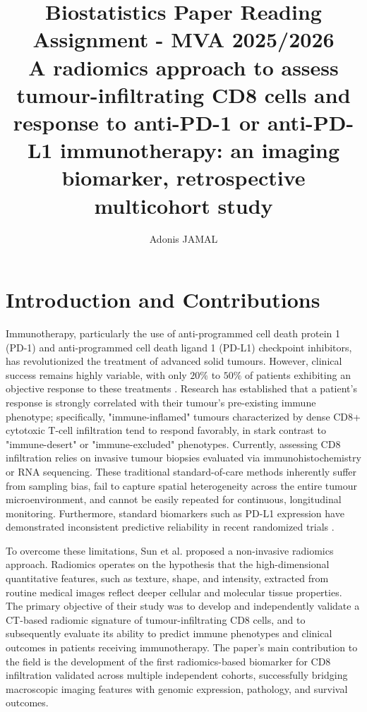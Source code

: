 \documentclass[10pt]{article}
\title{\vspace{-2cm}
      \LARGE{Biostatistics Paper Reading Assignment - MVA 2025/2026}
      \\ \large{A radiomics approach to assess tumour-infiltrating CD8 cells and response to anti-PD-1 or anti-PD-L1 immunotherapy: an imaging biomarker, retrospective multicohort study}
      }
\author{
Adonis JAMAL \email{adonis.jamal@student-cs.fr}
}
\date{\vspace{-5ex}}
\begin{document}
\maketitle


\section{Introduction and Contributions}
Immunotherapy, particularly the use of anti-programmed cell death protein 1 (PD-1) and anti-programmed cell death ligand 1 (PD-L1) checkpoint inhibitors, has revolutionized the treatment of advanced solid tumours. However, clinical success remains highly variable, with only $20\%$ to $50\%$ of patients exhibiting an objective response to these treatments \cite{chen2017elements}. Research has established that a patient's response is strongly correlated with their tumour's pre-existing immune phenotype; specifically, "immune-inflamed" tumours characterized by dense CD8+ cytotoxic T-cell infiltration tend to respond favorably, in stark contrast to "immune-desert" or "immune-excluded" phenotypes. Currently, assessing CD8 infiltration relies on invasive tumour biopsies evaluated via immunohistochemistry or RNA sequencing. These traditional standard-of-care methods inherently suffer from sampling bias, fail to capture spatial heterogeneity across the entire tumour microenvironment, and cannot be easily repeated for continuous, longitudinal monitoring. Furthermore, standard biomarkers such as PD-L1 expression have demonstrated inconsistent predictive reliability in recent randomized trials \cite{gandhi2018pembro}.

To overcome these limitations, Sun et al. \cite{main} proposed a non-invasive radiomics approach. Radiomics operates on the hypothesis that the high-dimensional quantitative features, such as texture, shape, and intensity, extracted from routine medical images reflect deeper cellular and molecular tissue properties. The primary objective of their study was to develop and independently validate a CT-based radiomic signature of tumour-infiltrating CD8 cells, and to subsequently evaluate its ability to predict immune phenotypes and clinical outcomes in patients receiving immunotherapy. The paper's main contribution to the field is the development of the first radiomics-based biomarker for CD8 infiltration validated across multiple independent cohorts, successfully bridging macroscopic imaging features with genomic expression, pathology, and survival outcomes.
\end{document}
